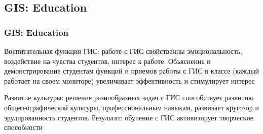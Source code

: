 \documentclass[pdflatex,compress,8pt,
	xcolor={dvipsnames,dvipsnames,svgnames,x11names,table},
	hyperref={	 
	pdfauthor={Lemenkova Polina}, 
	pdfsubject={Preentation}, 
	pdfcreator={Lemenkova Polina}, 
	pdfproducer={Lemenkova Polina}, 
	colorlinks=true,
	linkcolor=Red3, 
	citecolor=NavyBlue, 
	urlcolor = NavyBlue, 
	breaklinks = true}]{beamer}
\begin{document}
\subsection{GIS: Education}
\begin{frame}\frametitle{GIS: Education}

\begin{alertblock}{}
Воспитательная функция ГИС: работе с ГИС свойственны эмоциональность, воздействие на чувства студентов, интерес к работе. Объяснение и демонстрирование студентам функций и приемов работы с ГИС в классе (каждый работает на своем мониторе) увеличивает эффективность и стимулирует интерес
\end{alertblock}

\begin{figure}[H]
	\centering
			\hspace{1mm}
			\hspace{1mm}
\end{figure}

\begin{block}{}
Развитие культуры: решение разнообразных задач с ГИС способствует развитию общегеографической культуры, профессиональным навыкам, развивает кругозор и эрудированность студентов. Результат: обучение с ГИС активизирует творческие способности
\end{block}

\end{frame}
\end{document}
